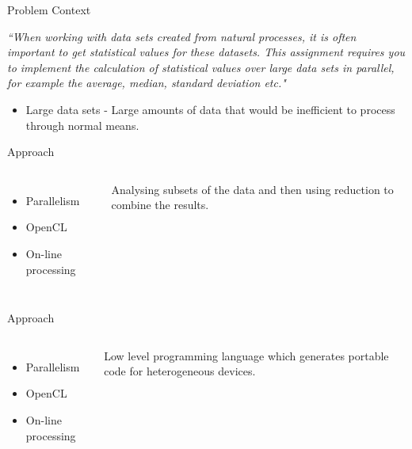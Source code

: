 \documentclass[10pt,aspectratio=169]{beamer} %
\newcommand{\hide}[1] {
	\textcolor{hiddencolor}{#1}
}
\begin{document}
\begin{frame}[t]{Problem Context}
\vspace{3em}

\emph{``When working with data sets created from natural processes, it is often important to get statistical values for these datasets. This assignment requires you to implement the calculation of statistical values over \alert{large data sets} in parallel, for example the average, median, standard deviation etc."}

\vfill
\begin{itemize}
\item  \alert{Large data sets} - Large amounts of data that would be inefficient to process through normal means.
\end{itemize}

\end{frame}

\begin{frame}{Approach}


\begin{columns}[onlytextwidth]
\column{\dimexpr\linewidth-90mm-5mm}
\begin{itemize}
\item \alert{Parallelism}
\item \hide{OpenCL}
\item \hide{On-line processing}
\end{itemize}

\column{90mm}
\large
Analysing subsets of the data and then using reduction to combine the results.
\end{columns}

\end{frame}

\begin{frame}{Approach}


\begin{columns}[onlytextwidth]
\column{\dimexpr\linewidth-85mm-5mm}
\begin{itemize}
\item \hide{Parallelism}
\item \alert{OpenCL}
\item \hide{On-line processing}
\end{itemize}

\column{85mm}
\large
Low level programming language which generates portable code for heterogeneous devices.

\end{columns}

\end{frame}
\end{document}

